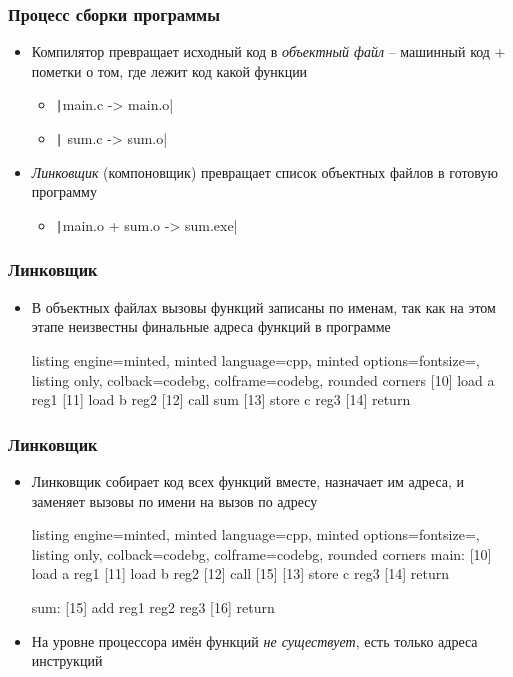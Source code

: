 \documentclass[10pt]{beamer}
\begin{document}
\begin{frame}[fragile]
\frametitle{Процесс сборки программы}
\begin{itemize}
\item Компилятор превращает исходный код в \textit{объектный файл} -- машинный код + пометки о том, где лежит код какой функции
\begin{itemize}
\item \texttt|main.c -> main.o|
\item \texttt| sum.c ->  sum.o|
\end{itemize}
\pause
\item \textit{Линковщик} (компоновщик) превращает список объектных файлов в готовую программу
\begin{itemize}
\item \texttt|main.o + sum.o -> sum.exe|
\end{itemize}
\end{itemize}
\end{frame}

\begin{frame}[fragile]
\frametitle{Линковщик}
\begin{itemize}
\item В объектных файлах вызовы функций записаны по именам, так как на этом этапе неизвестны финальные адреса функций в программе
\begin{tcblisting}{listing engine=minted, minted language=cpp, minted options={fontsize=\scriptsize}, listing only, colback=codebg, colframe=codebg, rounded corners}
[10] load a reg1
[11] load b reg2
[12] call sum
[13] store c reg3
[14] return
\end{tcblisting}
\end{itemize}
\end{frame}

\begin{frame}[fragile]
\frametitle{Линковщик}
\begin{itemize}
\item Линковщик собирает код всех функций вместе, назначает им адреса, и заменяет вызовы по имени на вызов по адресу
\begin{tcblisting}{listing engine=minted, minted language=cpp, minted options={fontsize=\scriptsize}, listing only, colback=codebg, colframe=codebg, rounded corners}
main:
[10] load a reg1
[11] load b reg2
[12] call [15]
[13] store c reg3
[14] return

sum:
[15] add reg1 reg2 reg3
[16] return
\end{tcblisting}
\pause
\item На уровне процессора имён функций \textit{не существует}, есть только адреса инструкций
\end{itemize}
\end{frame}
\end{document}
